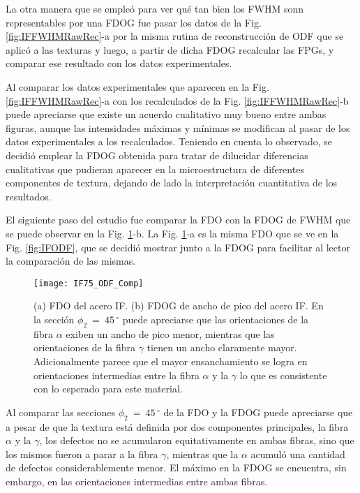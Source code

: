 La otra manera que se empleó para ver qué tan bien los FWHM sonn representables por una FDOG fue pasar los datos de la Fig. \ref{fig:IFFWHMRawRec}-a por la misma rutina de reconstrucción de ODF que se aplicó a las texturas y luego, a partir de dicha FDOG recalcular las FPGs, y comparar ese resultado con los datos experimentales.

Al comparar los datos experimentales que aparecen en la Fig. \ref{fig:IFFWHMRawRec}-a con los recalculados de la Fig. \ref{fig:IFFWHMRawRec}-b puede apreciarse que existe un acuerdo cualitativo muy bueno entre ambas figuras, aunque las intensidades máximas y mínimas se modifican al pasar de los datos experimentales a los recalculados.
Teniendo en cuenta lo observado, se decidió emplear la FDOG obtenida para tratar de dilucidar diferencias cualitativas que pudieran aparecer en la microestructura de diferentes componentes de textura, dejando de lado la interpretación cuantitativa de los resultados.

El siguiente paso del estudio fue comparar la FDO con la FDOG de FWHM que se puede observar en la Fig. \ref{fig:IFODFComp}-b.
La Fig. \ref{fig:IFODFComp}-a es la misma FDO que se ve en la Fig. \ref{fig:IFODF}, que se decidió mostrar junto a la FDOG para facilitar al lector la comparación de las mismas.
\begin{figure}[!htb]
  \centering
  \texttt{[image: IF75\_ODF\_Comp]}
  \caption{(a) FDO del acero IF. (b) FDOG de ancho de pico del acero IF. En la sección $\phi_2 \ = \ 45$\,$^{\circ}$ puede apreciarse que las orientaciones de la fibra $\alpha$ exiben un ancho de pico menor, mientras que las orientaciones de la fibra $\gamma$ tienen un ancho claramente mayor. Adicionalmente parece que el mayor ensanchamiento se logra en orientaciones intermedias entre la fibra $\alpha$ y la $\gamma$ lo que es consistente con lo esperado para este material.}
  \label{fig:IFODFComp}
\end{figure}

Al comparar las secciones $\phi_2 \ = \ 45$\,$^{\circ}$ de la FDO y la FDOG puede apreciarse que a pesar de que la textura está definida por dos componentes principales, la fibra $\alpha$ y  la $\gamma$, los defectos no se acumularon equitativamente en ambas fibras, sino que los mismos fueron a parar a la fibra $\gamma$, mientras que la $\alpha$ acumuló una cantidad de defectos considerablemente menor.
El máximo en la FDOG se encuentra, sin embargo, en las orientaciones intermedias entre ambas fibras.

\newpage
